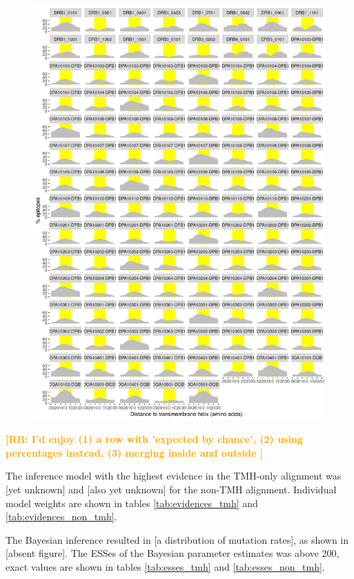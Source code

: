 \documentclass{article}
\newcommand{\richel}[1]{\textcolor{orange}{\textbf{[RB: #1]}}}
\begin{document}
\begin{figure}[ht]
  \includegraphics[width=\textwidth]{figure_3.png}
  \label{fig:3}
\end{figure}





\richel{
  I'd enjoy 
  (1) a row with 'expected by chance', 
  (2) using percentages instead,
  (3) merging inside and outside
}

The inference model with the highest evidence in the
TMH-only alignment was [yet unknown] and [also yet unknown]
for the non-TMH alignment. Individual model weights are shown
in tables \ref{tab:evidences_tmh} 
and \ref{tab:evidences_non_tmh}.

The Bayesian inference resulted in [a distribution of mutation rates],
as shown in [absent figure].
The ESSes of the Bayesian parameter estimates was above 200, exact values
are shown in tables \ref{tab:esses_tmh} and \ref{tab:esses_non_tmh}.
\end{document}
